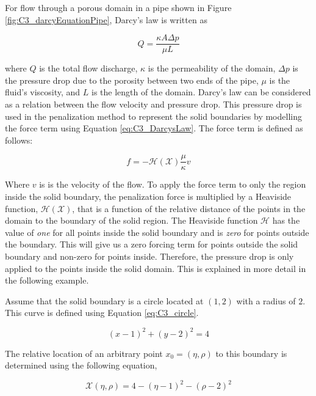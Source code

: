 For flow through a porous domain in a pipe shown in Figure \ref{fig:C3_darcyEquationPipe}, Darcy's law is written as

\begin{equation}\label{eq:C3_DarcysLaw}
    Q = \frac{\kappa A \Delta p}{\mu L}
\end{equation}

where $Q$ is the total flow discharge, $\kappa$ is the permeability of the domain, $\Delta p$ is the pressure drop due to the porosity between two ends of the pipe, $\mu$ is the fluid's viscosity, and $L$ is the length of the domain. Darcy's law can be considered as a relation between the flow velocity and pressure drop. This pressure drop is used in the penalization method to represent the solid boundaries by modelling the force term using Equation \eqref{eq:C3_DarcysLaw}. The force term is defined as follows:

\begin{equation}\label{eq:C3_forceTermIBpenelization}
    f = - \mathcal{H}(\mathcal{X}) \frac{\mu}{\kappa} v
\end{equation}

Where $v$ is is the velocity of the flow. To apply the force term to only the region inside the solid boundary, the penalization force is multiplied by a Heaviside function, $\mathcal{H}(\mathcal{X})$, that is a function of the relative distance of the points in the domain to the boundary of the solid region. The Heaviside function $\mathcal{H}$ has the value of \emph{one} for all points inside the solid boundary and is \emph{zero} for points outside the boundary. This will give us a zero forcing term for points outside the solid boundary and non-zero for points inside. Therefore, the pressure drop is only applied to the points inside the solid domain. This is explained in more detail in the following example.

Assume that the solid boundary is a circle located at $(1,2)$ with a radius of $2$. This curve is defined using Equation \eqref{eq:C3_circle}.

\begin{equation}\label{eq:C3_circle}
    (x - 1)^2 + (y - 2)^2 = 4
\end{equation}

The relative location of an arbitrary point $x_0 = (\eta, \rho)$ to this boundary is determined using the following equation,

\begin{equation}
    \mathcal{X}(\eta, \rho) = 4 - (\eta - 1)^2 - (\rho - 2)^2
\end{equation}

